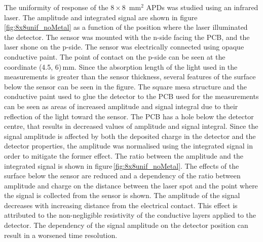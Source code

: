 \documentclass[review,number,sort&compress]{elsarticle}
\begin{document}
The uniformity of response of the $8 \times 8$~mm$^2$ APDs was studied using an infrared laser.
The amplitude and integrated signal are shown in figure\,\ref{fig:8x8unif_noMetal} as a function of the position where the laser illuminated the detector.
The sensor was mounted with the n-side facing the PCB, and the laser shone on the p-side.
The sensor was electrically connected using opaque conductive paint.
The point of contact on the p-side can be seen at the coordinate (4.5, 6)\,mm.
Since the absorption length of the light used in the measurements is greater than the sensor thickness, several features of the surface below the sensor can be seen in the figure.
The square mesa structure and the conductive paint used to glue the detector to the PCB used for the measurements can be seen as areas of increased amplitude and signal integral due to their reflection of the light toward the sensor.
The PCB has a hole below the detector centre, that results in decreased values of amplitude and signal integral.
Since the signal amplitude is affected by both the deposited charge in the detector and the detector properties, the amplitude was normalised using the integrated signal in order to mitigate the former effect.
The ratio between the amplitude and the integrated signal is shown in figure\,\ref{fig:8x8unif_noMetal}.
The effects of the surface below the sensor are reduced and a dependency of the ratio between amplitude and charge on the distance between the laser spot and the point where the signal is collected from the sensor is shown.
The amplitude of the signal decreases with increasing distance from the electrical contact.
This effect is attributed to the non-negligible resistivity of the conductive layers applied to the detector.
The dependency of the signal amplitude on the detector position can result in a worsened time resolution.
\end{document}
